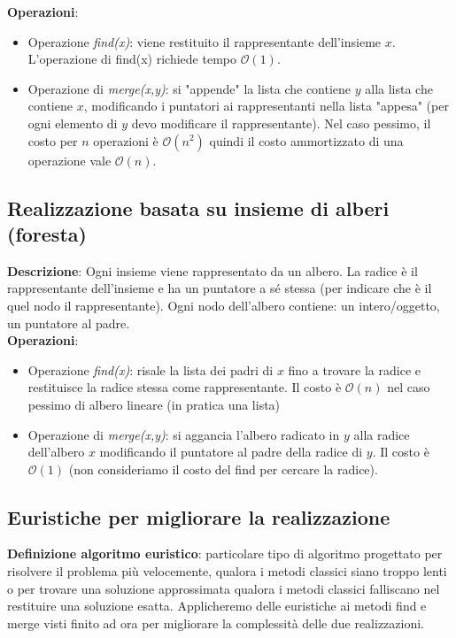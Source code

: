 \documentclass[../cheatSheetAlgoritmi.tex]{subfiles}
\begin{document}
\bigskip

\textbf{Operazioni}:
\begin{itemize}
	\item Operazione \emph{find(x)}: viene restituito il rappresentante dell'insieme $x$. L'operazione di find(x) richiede tempo $\mathcal{O}(1)$.
	\item Operazione di \emph{merge(x,y)}: si "appende" la lista che contiene $y$ alla lista che contiene $x$, modificando i puntatori ai rappresentanti nella lista "appesa" (per ogni elemento di $y$ devo modificare il rappresentante). Nel caso pessimo, il costo per $n$ operazioni è $\mathcal{O}(n^{2})$ quindi il costo ammortizzato di una operazione vale $\mathcal{O}(n)$. 
\end{itemize}
\subsection{Realizzazione basata su insieme di alberi (foresta)}
\textbf{Descrizione}: Ogni insieme viene rappresentato da un albero. La radice è il rappresentante dell'insieme e ha un puntatore a sé stessa (per indicare che è il quel nodo il rappresentante). Ogni nodo dell'albero contiene: un intero/oggetto, un puntatore al padre.\\
\textbf{Operazioni}:
\begin{itemize}
	\item Operazione \emph{find(x)}: risale la lista dei padri di $x$ fino a trovare la radice e restituisce la radice stessa come rappresentante. Il costo è $\mathcal{O}(n)$ nel caso pessimo di albero lineare (in pratica una lista)
	\item Operazione di \emph{merge(x,y)}: si aggancia l'albero radicato in $y$ alla radice dell'albero $x$ modificando il puntatore al padre della radice di $y$. Il costo è $\mathcal{O}(1)$ (non consideriamo il costo del find per cercare la radice).  
\end{itemize}
\subsection{Euristiche per migliorare la realizzazione}
\textbf{Definizione algoritmo euristico}: particolare tipo di algoritmo progettato per risolvere il problema più velocemente, qualora i metodi classici siano troppo lenti o per trovare una soluzione approssimata qualora i metodi classici falliscano nel restituire una soluzione esatta. Applicheremo delle euristiche ai metodi find e merge visti finito ad ora per migliorare la complessità delle due realizzazioni. 
\end{document}
